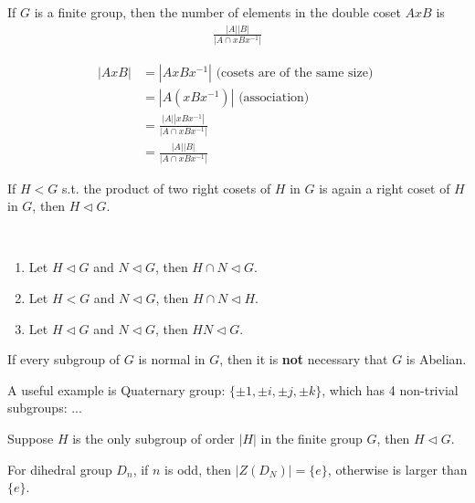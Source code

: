 \begin{question}
    If $G$ is a finite group, then the number of elements in the double coset $AxB$ is
    \begin{align*}
        \frac{|A||B|}{|A \cap xBx^{-1}|}
    \end{align*}
\end{question}
\begin{align*}
    |AxB| &=|AxBx^{-1}| \text{ (cosets are of the same size) }
    \\ &= |A(xBx^{-1})| \text{ (association) }
    \\ &= \frac{|A||xBx^{-1}|}{|A \cap xBx^{-1}|} 
    \\ &= \frac{|A||B|}{|A \cap xBx^{-1}|}
\end{align*}

\begin{question}
If $H < G$ s.t. the product of two right cosets of $H$ in $G$ is again a right coset of $H$ in $G$, then $H \triangleleft G$.
\end{question}

\begin{question} ~
    \begin{enumerate}
        \item Let $H \triangleleft G$ and $N \triangleleft G$, then $H \cap N \triangleleft G$.
        \item Let $H < G$ and $N \triangleleft G$, then $H \cap N \triangleleft H$.
        \item Let $H \triangleleft G$ and $N \triangleleft G$, then $HN \triangleleft G$.
    \end{enumerate}
\end{question}

\begin{question}
    If every subgroup of $G$ is normal in $G$, then it is \textbf{not} necessary that $G$ is Abelian.
\end{question}

\begin{remark}
    A useful example is Quaternary group: $\{ \pm 1, \pm i, \pm j, \pm k \}$, which has 4 non-trivial subgroups: ...
\end{remark}

\begin{question}
    Suppose $H$ is the only subgroup of order $|H|$ in the finite group $G$, then $H \triangleleft G$.
\end{question}

\begin{question}
    For dihedral group $D_n$, if $n$ is odd, then $|Z(D_N)| = \{ e \}$, otherwise is larger than $\{ e \}$.
\end{question}

